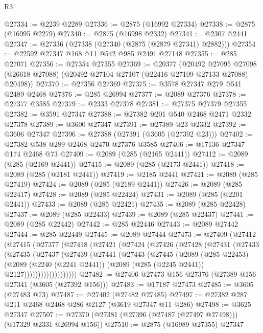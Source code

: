 \begin{lexlean}{R3}
\begin{coremodule}
@27334 := @2239 @2289
@27336 := @2875 (@16992 @27334)
@27338 := @2875 (@16995 @2279)
@27340 := @2875 (@16998 @2332)
@27341 := @2307 @2441
@27347 := @27336 (@27338 (@27340 (@2875 (@2879 @27341) @2882)))
@27354 := @22592 @27347 @168 @11 @542 @985 @2491 @27148
@27355 := @285 @27071
@27356 := @27354 @27355
@27369 := @20377
    (@20492
      @27095
      @27098
      (@26618 @27088)
      (@20492 @27104 @27107 (@22416 @27109 @27133 @27088) @20498))
@27370 := @27356 @27369
@27375 := @3578 @27347 @279 @541 @2489 @2468
@27376 := @285 @26994
@27377 := @2089 @27376
@27378 := @27377 @3585
@27379 := @2333 @27378
@27381 := @27375 @27379 @27355
@27382 := @3591 @27347
@27388 := @27382 @201 @540 @2468 @2471 @2332 @27378
@27389 := @3600 @27347
@27391 := @27389 @23 @2332
@27392 := @3606 @27347
@27396 := @27388 (@27391 (@3605 (@27392 @23)))
@27402 := @27382 @538 @289 @2468 @2470 @27376 @3585
@27406 := @17136 @27347 @174 @2468 @73
@27409 := @2089 (@285 (@2165 @2441))
@27412 := @2089 (@285 (@2169 @2441))
@27415 := @2089 (@285 (@2173 @2441))
@27418 := @2089 (@285 (@2181 @2441))
@27419 := @2185 @2441
@27421 := @2089 (@285 @27419)
@27424 := @2089 (@285 (@2189 @2441))
@27426 := @2089 (@285 @22417)
@27428 := @2089 (@285 @22424)
@27431 := @2089 (@285 (@2201 @2441))
@27433 := @2089 (@285 @22421)
@27435 := @2089 (@285 @22428)
@27437 := @2089 (@285 @22433)
@27439 := @2089 (@285 @22437)
@27441 := @2089 (@285 @22442)
@27442 := @285 @22446
@27443 := @2089 @27442
@27444 := @285 @22449
@27445 := @2089 @27444
@27473 := @27409
    (@27412
      (@27415
        (@27377
          (@27418
            (@27421
              (@27424
                (@27426
                  (@27428
                    (@27431
                      (@27433
                        (@27435
                          (@27437
                            (@27439
                              (@27441
                                (@27443
                                  (@27445
                                    (@2089
                                      (@285 @22453)
                                      (@2089
                                        (@2240 (@2241 @2441))
                                        (@2089 (@285 (@2245 @2441)) @2127)))))))))))))))))))
@27482 := @27406 @27473 @156 @27376 (@27389 @156 @27341 (@3605 (@27392 @156)))
@27483 := @17187 @27473
@27485 := @3605 (@27483 @73)
@27487 := @27402 (@27482 @27485)
@27497 := @27382 @287 @211 @2468 @2468 @286 @2127 (@3619 @27347 @11 @286)
@27498 := @3625 @27347
@27507 := @27370 (@27381 (@27396 (@27487 (@27497 @27498))) (@17329 @2331 @26994 @156))
@27510 := @2875 (@16989 @27355) @27347

\end{coremodule}
\end{lexlean}
